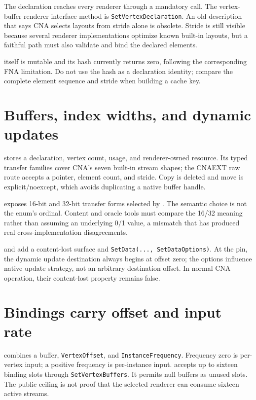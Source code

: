 The declaration reaches every renderer through a mandatory call.  The vertex-buffer renderer
interface method is \texttt{SetVertexDeclaration}.%
 An old description that says CNA
selects layouts from stride alone is obsolete.  Stride is still visible because several renderer
implementations optimize known built-in layouts, but a faithful path must also validate and bind
the declared elements.

 itself is mutable and its hash currently returns zero, following the
corresponding FNA limitation.  Do not use the hash as a declaration identity; compare the complete
element sequence and stride when building a cache key.

\section{Buffers, index widths, and dynamic updates}

 stores a declaration, vertex count, usage, and renderer-owned resource.
Its typed transfer families cover CNA's seven built-in stream shapes; the CNAEXT raw route accepts
a pointer, element count, and stride.  Copy is deleted and move is explicit/noexcept, which avoids
duplicating a native buffer handle.

 exposes 16-bit and 32-bit transfer forms selected by
.  The semantic choice is not the enum's ordinal.  Content and oracle
tools must compare the 16/32 meaning rather than assuming an underlying 0/1 value, a mismatch that
has produced real cross-implementation disagreements.

 and  add a content-lost surface and
\texttt{SetData(..., SetDataOptions)}.  At the pin, the dynamic update destination always begins at
offset zero; the options influence native update strategy, not an arbitrary destination offset.
In normal CNA operation, their content-lost property remains false.

\section{Bindings carry offset and input rate}

 combines a buffer, \texttt{VertexOffset}, and
\texttt{InstanceFrequency}.  Frequency zero is per-vertex input; a positive frequency is
per-instance input.   accepts up to sixteen binding slots through
\texttt{SetVertexBuffers}. It permits null buffers as
unused slots.  The public ceiling is not proof that the selected
renderer can consume sixteen active streams.

